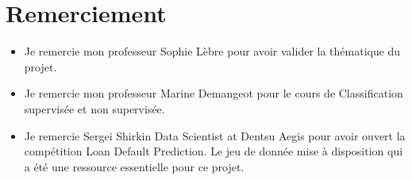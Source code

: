 {\vspace*{8cm}\large
\section*{Remerciement}
\begin{itemize}
\item Je remercie mon professeur Sophie Lèbre pour avoir valider la thématique du projet.
\item Je remercie mon professeur Marine Demangeot pour le cours de Classification supervisée et non supervisée.
\item Je remercie Sergei Shirkin Data Scientist at Dentsu Aegis pour avoir ouvert la compétition Loan Default Prediction. Le jeu de donnée mise à disposition qui a été une ressource essentielle pour ce projet. 
\end{itemize}
}
\newpage